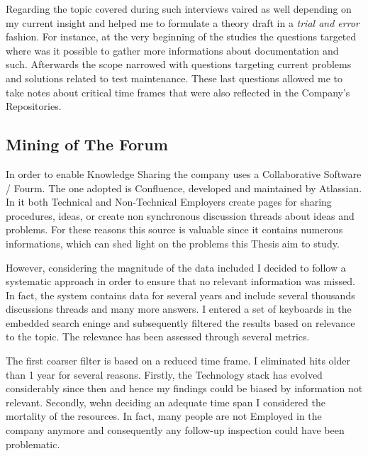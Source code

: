 Regarding the topic covered during such interviews vaired as well depending on my current insight and helped me to formulate a theory draft in a \textit{trial and error} fashion. For instance, at the very beginning of the studies the questions targeted where was it possible to gather more informations about documentation and such. Afterwards the scope narrowed with questions targeting current problems and solutions related to test maintenance. These last questions allowed me to take notes about critical time frames that were also reflected in the Company's Repositories.



% 



\subsection{Mining of The Forum}
In order to enable Knowledge Sharing the company uses a Collaborative Software / Fourm. The one adopted is Confluence, developed and maintained by Atlassian. In it both Technical and Non-Technical Employers create pages for sharing procedures, ideas, or create non synchronous discussion threads about ideas and problems. For these reasons this source is valuable since it contains numerous informations, which can shed light on the problems this Thesis aim to study.

However, considering the magnitude of the data included I decided to follow a systematic approach in order to ensure that no relevant information was missed. In fact, the system contains data for several years and include several thousands discussions threads and many more answers. 
I entered a set of keyboards in the embedded search eninge and subsequently filtered the results based on relevance to the topic. The relevance has been assessed through several metrics.

The first coarser filter is based on a reduced time frame. I eliminated hits older than 1 year for several reasons. Firstly, the Technology stack has evolved considerably since then and hence my findings could be biased by information not relevant. Secondly, wehn deciding an adequate time span I considered the mortality of the resources. In fact, many people are not Employed in the company anymore and consequently any follow-up inspection could have been problematic.


